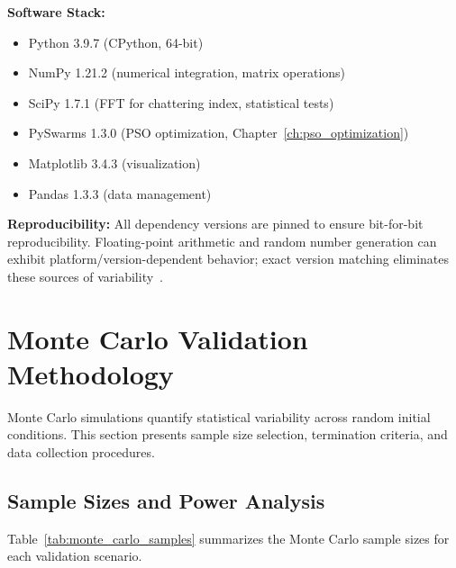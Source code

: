 \textbf{Software Stack:}
\begin{itemize}
    \item Python 3.9.7 (CPython, 64-bit)
    \item NumPy 1.21.2 (numerical integration, matrix operations)
    \item SciPy 1.7.1 (FFT for chattering index, statistical tests)
    \item PySwarms 1.3.0 (PSO optimization, Chapter~\ref{ch:pso_optimization})
    \item Matplotlib 3.4.3 (visualization)
    \item Pandas 1.3.3 (data management)
\end{itemize}

\textbf{Reproducibility:}
All dependency versions are pinned to ensure bit-for-bit reproducibility. Floating-point arithmetic and random number generation can exhibit platform/version-dependent behavior; exact version matching eliminates these sources of variability~\cite{stodden2014implementing}.

\section{Monte Carlo Validation Methodology}
\label{sec:monte_carlo}

Monte Carlo simulations quantify statistical variability across random initial conditions. This section presents sample size selection, termination criteria, and data collection procedures.

\subsection{Sample Sizes and Power Analysis}
\label{subsec:sample_sizes}

Table~\ref{tab:monte_carlo_samples} summarizes the Monte Carlo sample sizes for each validation scenario.

